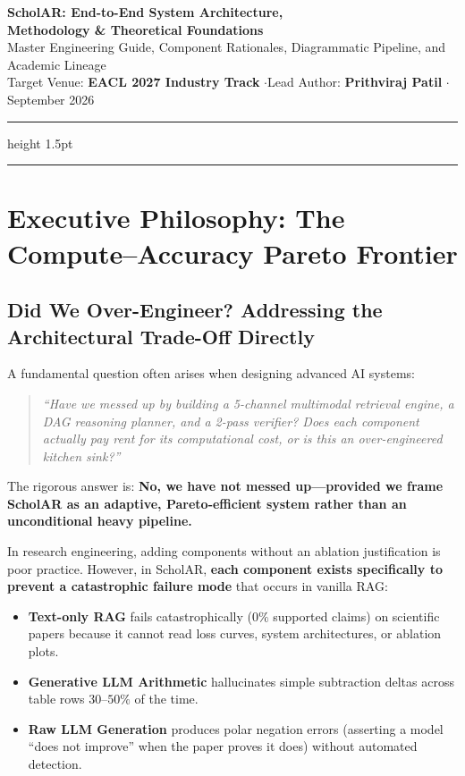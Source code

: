 \documentclass[11pt,a4paper]{article}
\begin{document}
\begin{center}
    {\huge\bfseries\color{primary} ScholAR: End-to-End System Architecture,}\\[4pt]
    {\huge\bfseries\color{primary} Methodology \& Theoretical Foundations}\\[6pt]
    {\large\color{secondary} Master Engineering Guide, Component Rationales, Diagrammatic Pipeline, and Academic Lineage}\\[4pt]
    {\color{subtle} Target Venue: \textbf{EACL 2027 Industry Track} \quad$\cdot$\quad Lead Author: \textbf{Prithviraj Patil} \quad$\cdot$\quad September 2026}
\end{center}
\vspace{-4pt}
\hrule height 1.5pt
\vspace{8pt}

\tableofcontents
\vspace{10pt}
\hrule
\vspace{10pt}

\section{Executive Philosophy: The Compute--Accuracy Pareto Frontier}

\subsection{Did We Over-Engineer? Addressing the Architectural Trade-Off Directly}
A fundamental question often arises when designing advanced AI systems:
\begin{quote}
\emph{``Have we messed up by building a 5-channel multimodal retrieval engine, a DAG reasoning planner, and a 2-pass verifier? Does each component actually pay rent for its computational cost, or is this an over-engineered kitchen sink?''}
\end{quote}

The rigorous answer is: \textbf{No, we have not messed up---provided we frame ScholAR as an adaptive, Pareto-efficient system rather than an unconditional heavy pipeline.}

In research engineering, adding components without an ablation justification is poor practice. However, in ScholAR, \textbf{each component exists specifically to prevent a catastrophic failure mode} that occurs in vanilla RAG:
\begin{itemize}[leftmargin=*]
    \item \textbf{Text-only RAG} fails catastrophically ($0\%$ supported claims) on scientific papers because it cannot read loss curves, system architectures, or ablation plots.
    \item \textbf{Generative LLM Arithmetic} hallucinates simple subtraction deltas across table rows $30\text{--}50\%$ of the time.
    \item \textbf{Raw LLM Generation} produces polar negation errors (asserting a model ``does not improve'' when the paper proves it does) without automated detection.
\end{itemize}
\end{document}
